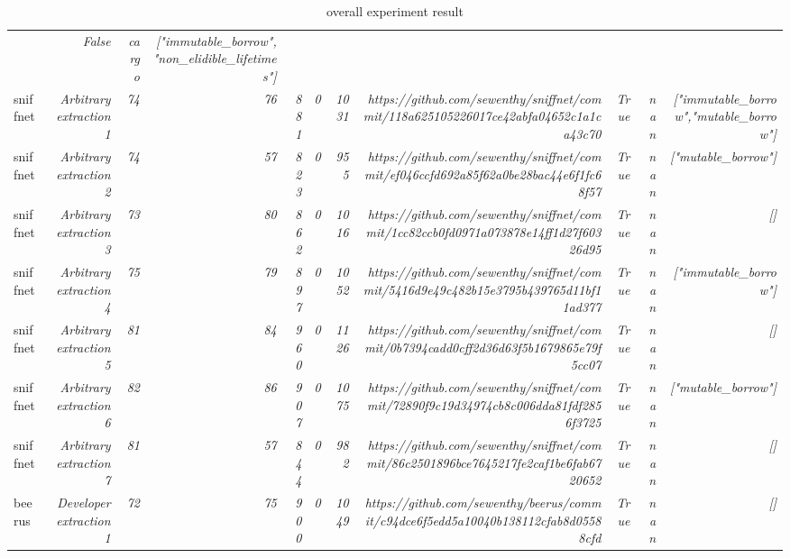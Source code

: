\begin{table}[]
{\begin{tabular}{lrrrrrrrrrr}
{} & \textit{False} & \textit{cargo} & \textit{["immutable_borrow","non_elidible_lifetimes"]} \\
sniffnet & \textit{Arbitrary extraction 1} & \textit{74} & \textit{76} & \textit{881} & \textit{0} & \textit{1031} & \textit{https://github.com/sewenthy/sniffnet/commit/118a625105226017ce42abfa04652c1a1ca43c70
} & \textit{True} & \textit{nan} & \textit{["immutable_borrow","mutable_borrow"]} \\
sniffnet & \textit{Arbitrary extraction 2} & \textit{74} & \textit{57} & \textit{823} & \textit{0} & \textit{955} & \textit{https://github.com/sewenthy/sniffnet/commit/ef046ccfd692a85f62a0be28bac44e6f1fc68f57
} & \textit{True} & \textit{nan} & \textit{["mutable_borrow"]} \\
sniffnet & \textit{Arbitrary extraction 3} & \textit{73} & \textit{80} & \textit{862} & \textit{0} & \textit{1016} & \textit{https://github.com/sewenthy/sniffnet/commit/1cc82ccb0fd0971a073878e14ff1d27f60326d95
} & \textit{True} & \textit{nan} & \textit{[]} \\
sniffnet & \textit{Arbitrary extraction 4} & \textit{75} & \textit{79} & \textit{897} & \textit{0} & \textit{1052} & \textit{https://github.com/sewenthy/sniffnet/commit/5416d9e49c482b15e3795b439765d11bf11ad377
} & \textit{True} & \textit{nan} & \textit{["immutable_borrow"]} \\
sniffnet & \textit{Arbitrary extraction 5} & \textit{81} & \textit{84} & \textit{960} & \textit{0} & \textit{1126} & \textit{https://github.com/sewenthy/sniffnet/commit/0b7394cadd0cff2d36d63f5b1679865e79f5cc07
} & \textit{True} & \textit{nan} & \textit{[]} \\
sniffnet & \textit{Arbitrary extraction 6} & \textit{82} & \textit{86} & \textit{907} & \textit{0} & \textit{1075} & \textit{https://github.com/sewenthy/sniffnet/commit/72890f9c19d34974cb8c006dda81fdf2856f3725
} & \textit{True} & \textit{nan} & \textit{["mutable_borrow"]} \\
sniffnet & \textit{Arbitrary extraction 7} & \textit{81} & \textit{57} & \textit{844} & \textit{0} & \textit{982} & \textit{https://github.com/sewenthy/sniffnet/commit/86c2501896bce7645217fe2caf1be6fab6720652
} & \textit{True} & \textit{nan} & \textit{[]} \\
beerus & \textit{Developer extraction 1} & \textit{72} & \textit{75} & \textit{900} & \textit{0} & \textit{1049} & \textit{https://github.com/sewenthy/beerus/commit/c94dce6f5edd5a10040b138112cfab8d05588cfd
} & \textit{True} & \textit{nan} & \textit{[]} \\ \hline
\end{tabular}%
}
\caption{\tool overall experiment result}
\label{table:overallExprResult}
\end{table}
